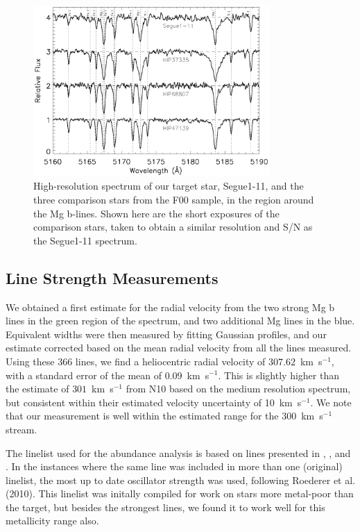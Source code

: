 \documentclass[manuscript]{aastex}
\begin{document}
\begin{figure}
 \begin{center}
  \includegraphics[width=9cm]{Mgspecs.ps}
  \caption{High-resolution spectrum of our target star, Segue1-11, and the three comparison stars from the F00 sample, in the region around the Mg b-lines. Shown here are the short exposures of the comparison stars, taken to obtain a similar resolution and S/N as the Segue1-11 spectrum.}
  \label{fig:mglines}
 \end{center}
\end{figure}



\subsection{Line Strength Measurements}
\label{sec:linemes}
We obtained a first estimate for the radial velocity from the two strong Mg b lines in the green region of the spectrum, and two additional Mg lines in the blue. Equivalent widths were then measured by fitting Gaussian profiles, and our estimate corrected based on the mean radial velocity from all the lines measured. Using these 366 lines, we find a heliocentric radial velocity of $307.62$~km~s$^{-1}$, with a standard error of the mean of 0.09~km~s$^{-1}$. This is slightly higher than the estimate of $301$~km~s$^{-1}$ from N10 based on the medium resolution spectrum, but consistent within their estimated velocity uncertainty of 10~km~s$^{-1}$. We note that our measurement is well within the estimated range for the 300~km~s$^{-1}$ stream.

The linelist used for the abundance analysis is based on lines presented in \citet{Roederer2010}, \citet{Aoki2007b}, and \citet{Cayrel2004}. In the instances where the same
line was included in more than one (original) linelist, the most up to
date oscillator strength was used, following Roederer et al. (2010).
This linelist was initally compiled for work on stars more metal-poor than
the target, but besides the strongest lines, we found it to
work well for this metallicity range also.
\end{document}
